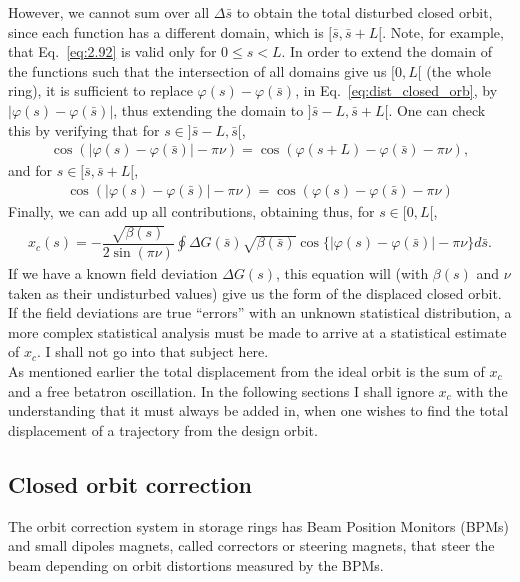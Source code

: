 However, we cannot sum over all $\Delta \bar{s}$ to obtain the total disturbed closed orbit, since each function has a different domain, which is $[\bar{s},\bar{s}+L[$. Note, for example, that Eq.~\eqref{eq:2.92} is valid only for $0 \leq s < L$. In order to extend the domain of the functions such that the intersection of all domains give us $[0,L[$ (the whole ring), it is sufficient to replace $\varphi(s) - \varphi(\bar{s})$, in Eq.~\eqref{eq:dist_closed_orb}, by $|\varphi(s) - \varphi(\bar{s})|$, thus extending the domain to $]\bar{s}-L,\bar{s}+L[$. One can check this by verifying that for $s \in ]\bar{s}-L,\bar{s}[$,
\begin{align*}
	\cos(|\varphi(s) - \varphi(\bar{s})| - \pi\nu) = \cos(\varphi(s+L) - \varphi(\bar{s})-\pi\nu),
\end{align*}
and for $s \in [\bar{s},\bar{s}+L[$,
\begin{align*}
\cos(|\varphi(s) - \varphi(\bar{s})| - \pi\nu) = \cos(\varphi(s) - \varphi(\bar{s}) - \pi\nu)
\end{align*}
Finally, we can add up all contributions, obtaining thus, for $s \in [0,L[$,
\begin{align}\label{eq:2.94}
	\boxed{ x_c(s) = -\dfrac{\sqrt{\beta(s)}}{2\sin{(\pi\nu)}} \oint \Delta G(\bar{s}) \sqrt{\beta(\bar{s})}\cos\{ |\varphi(s) - \varphi(\bar{s})| - \pi\nu \} d\bar{s} }.
\end{align}
If we have a known field deviation $\Delta G(s)$, this equation will (with $\beta(s)$ and $\nu$ taken as their undisturbed values) give us the form of the displaced closed orbit.\\
If the field deviations are true ``errors'' with an unknown statistical distribution, a more complex statistical analysis must be made to arrive at a statistical estimate of $x_c$. I shall not go into that subject here.\\
As mentioned earlier the total displacement from the ideal orbit is the sum of $x_c$ and a free betatron oscillation. In the following sections I shall ignore $x_c$ with the understanding
 that it must always be added in, when one wishes to find the total displacement of a trajectory
 from the design orbit.

 \subsection{Closed orbit correction}

 The orbit correction system in storage rings has Beam Position Monitors (BPMs) and small dipoles magnets, called correctors or steering magnets, that steer the beam depending on orbit distortions measured by the BPMs.


